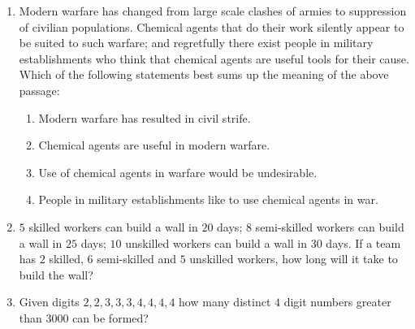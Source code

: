 \documentclass[journal,12pt,onecolumn]{IEEEtran}
\theoremstyle{remark}
\begin{document}
\begin{enumerate}
\item Modern warfare has changed from large scale clashes of armies to suppression of civilian populations. Chemical agents that do their work silently appear to be suited to such warfare; and regretfully there exist people in military establishments who think that chemical agents are useful tools for their cause.
Which of the following statements best sums up the meaning of the above passage:
\hfill{}
\begin{enumerate}
\item Modern warfare has resulted in civil strife.
\item Chemical agents are useful in modern warfare.
\item Use of chemical agents in warfare would be undesirable.
\item People in military establishments like to use chemical agents in war.
\end{enumerate}

\item $5$ skilled workers can build a wall in $20$ days; $8$ semi-skilled workers can build a wall in $25$ days; $10$ unskilled workers can build a wall in $30$ days. If a team has $2$ skilled, $6$ semi-skilled and $5$ unskilled workers, how long will it take to build the wall?
\hfill{}
\begin{enumerate}
\end{enumerate}

\item Given digits $2, 2, 3, 3, 3, 4, 4, 4, 4$ how many distinct $4$ digit numbers greater than $3000$ can be formed?
\hfill{}
\begin{enumerate}
\end{enumerate}

\end{enumerate}
\end{document}
